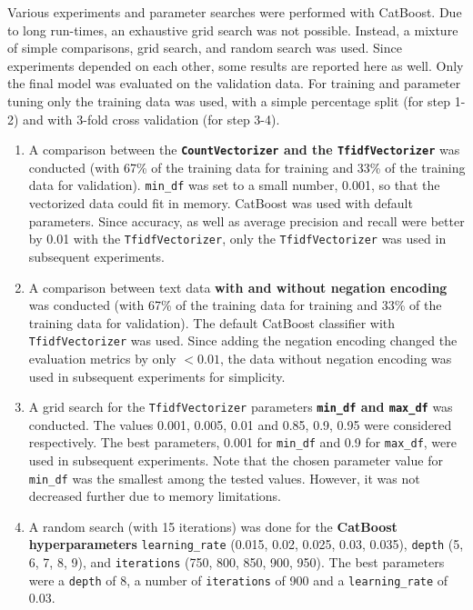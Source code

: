 \documentclass{article}
\begin{document}
	Various experiments and parameter searches were performed with CatBoost. Due to long run-times, an exhaustive grid search was not possible. Instead, a mixture of simple comparisons, grid search, and random search was used. Since experiments depended on each other, some results are reported here as well. Only the final model was evaluated on the validation data. For training and parameter tuning only the training data was used, with a simple percentage split (for step 1-2) and with 3-fold cross validation (for step 3-4).
	
	
	\begin{enumerate}
		\item 	A comparison between the \textbf{\lstinline{CountVectorizer} and the \lstinline{TfidfVectorizer}} was conducted (with 67\% of the training data for training and 33\% of the training data for validation). \lstinline{min_df} was set to a small number, 0.001, so that the vectorized data could fit in memory. CatBoost was used with default parameters. Since accuracy, as well as average precision and recall were better by 0.01 with the \lstinline{TfidfVectorizer}, only the \lstinline{TfidfVectorizer} was used in subsequent experiments.
		\item 	A comparison between text data \textbf{with and without negation encoding} was conducted (with 67\% of the training data for training and 33\% of the training data for validation). The default CatBoost classifier with \lstinline{TfidfVectorizer} was used. Since adding the negation encoding changed the evaluation metrics by only $<0.01$, the data without negation encoding was used in subsequent experiments for simplicity.
		\item 	A grid search for the \lstinline{TfidfVectorizer} parameters \textbf{\lstinline{min_df} and \lstinline{max_df}} was conducted. The values 0.001, 0.005, 0.01 and 0.85, 0.9, 0.95 were considered	respectively. The best parameters, 0.001 for \lstinline{min_df} and 0.9 for \lstinline{max_df}, were used in subsequent experiments. Note that the chosen parameter value for \lstinline{min_df} was the smallest among the tested values. However, it was not decreased further due to memory limitations.
		\item 	A random search (with 15 iterations) was done for the \textbf{CatBoost hyperparameters} \lstinline{learning_rate} (0.015, 0.02, 0.025, 0.03, 0.035), \lstinline{depth} (5, 6, 7, 8, 9), and \lstinline{iterations} (750, 800, 850, 900, 950). The best parameters were a \lstinline{depth} of 8, a number of \lstinline{iterations} of 900 and a \lstinline{learning_rate} of 0.03.
	\end{enumerate}
	
\end{document}
